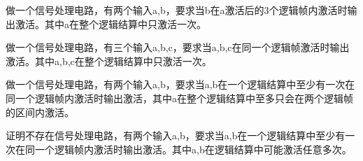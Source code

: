 \begin{problemset}[思考题]
\item 做一个信号处理电路，有两个输入a,b，要求当b在a激活后的3个逻辑帧内激活时输出激活。其中a在整个逻辑结算中只激活一次。
\item 做一个信号处理电路，有三个输入a,b,c，要求当a,b,c在同一个逻辑帧激活时输出激活。其中a,b,c在整个逻辑结算中只激活一次。
\item 做一个信号处理电路，有两个输入a,b，要求当a,b在一个逻辑结算中至少有一次在同一个逻辑帧内激活时输出激活，其中a在整个逻辑结算中至多只会在两个逻辑帧的区间内激活。
\item 证明不存在信号处理电路，有两个输入a,b，要求当a,b在一个逻辑结算中至少有一次在同一个逻辑帧内激活时输出激活。其中a,b在逻辑结算中可能激活任意多次。
\end{problemset}